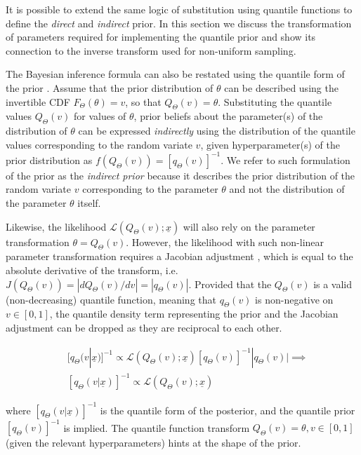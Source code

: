 \documentclass[
  12pt,
]{article}
\begin{document}
It is possible to extend the same logic of substitution using quantile functions to define the \emph{direct} and \emph{indirect} prior. In this section we discuss the transformation of parameters required for implementing the quantile prior and show its connection to the inverse transform used for non-uniform sampling.

The Bayesian inference formula can also be restated using the quantile form of the prior \citep{nair2020BayesianInferenceQuantile}. Assume that the prior distribution of \(\theta\) can be described using the invertible CDF \(F_\Theta(\theta)=v\), so that \(Q_\Theta(v)=\theta\). Substituting the quantile values \(Q_\Theta(v)\) for values of \(\theta\), prior beliefs about the parameter(s) of the distribution of \(\theta\) can be expressed \emph{indirectly} using the distribution of the quantile values corresponding to the random variate \(v\), given hyperparameter(s) of the prior distribution as \(f(Q_\Theta(v))=[q_\Theta(v)]^{-1}\). We refer to such formulation of the prior as the \emph{indirect prior} because it describes the prior distribution of the random variate \(v\) corresponding to the parameter \(\theta\) and not the distribution of the parameter \(\theta\) itself.

Likewise, the likelihood \(\mathcal{L}(Q_\Theta(v);\underline{x})\) will also rely on the parameter transformation \(\theta=Q_\Theta(v)\). However, the likelihood with such non-linear parameter transformation requires a Jacobian adjustment \citep{andrilli2010ElementaryLinearAlgebra}, which is equal to the absolute derivative of the transform, i.e.~\(J(Q_\Theta(v))=|dQ_\Theta(v)/dv|=|q_\Theta(v)|\). Provided that the \(Q_\Theta(v)\) is a valid (non-decreasing) quantile function, meaning that \(q_\Theta(v)\) is non-negative on \(v \in [0,1]\), the quantile density term representing the prior and the Jacobian adjustment can be dropped as they are reciprocal to each other.

\[ 
\begin{aligned}\;
&[q_\Theta(v|\underline{x})]^{-1} \propto \mathcal{L}(Q_\Theta(v);\underline{x})[q_\Theta(v)]^{-1}|q_\Theta(v)| \implies\\
&[q_\Theta(v|\underline{x})]^{-1} \propto \mathcal{L}(Q_\Theta(v);\underline{x})
\end{aligned}
\label{eq:bayesidqfeq}
\]

where \([q_\Theta(v|\underline{x})]^{-1}\) is the quantile form of the posterior, and the quantile prior \([q_\Theta(v)]^{-1}\) is implied. The quantile function transform \(Q_\Theta(v)=\theta,v \in [0,1]\) (given the relevant hyperparameters) hints at the shape of the prior.
\end{document}
